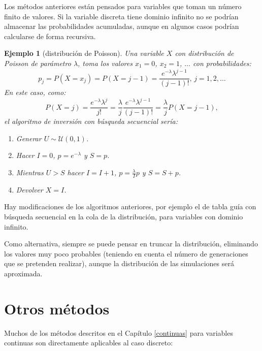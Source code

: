 \documentclass[
]{book}
\theoremstyle{break}
\newtheorem{example}{Ejemplo}[chapter]
\theoremstyle{nonumberplain}
\begin{document}
Los métodos anteriores están pensados para variables que toman un número finito de valores.
Si la variable discreta tiene dominio infinito no se podrían almacenar las probabilidades acumuladas, aunque en algunos casos podrían calcularse de forma recursiva.

\begin{example}[distribución de Poisson]

Una variable \(X\) con distribución de Poisson de parámetro \(\lambda\),
toma los valores \(x_{1}=0\), \(x_{2}=1\), \(\ldots\) con probabilidades:
\[p_{j}=P\left( X=x_{j}\right)  =P\left( X=j-1\right)  =\frac{e^{-\lambda
}\lambda^{j-1}}{\left( j-1\right)  !}\text{, }j=1,2,\ldots\]
En este caso, como:
\[P\left( X=j\right)  =\frac{e^{-\lambda}\lambda^{j}}{j!}
=\frac{\lambda}{j}\frac{e^{-\lambda}\lambda^{j-1}}{\left( j-1\right)  !}
=\frac{\lambda}{j}P\left( X=j-1\right),\]
el algoritmo de inversión con búsqueda secuencial sería:

\begin{enumerate}
\def\labelenumi{\arabic{enumi}.}
\item
  Generar \(U\sim \mathcal{U}\left( 0,1\right)\).
\item
  Hacer \(I=0\), \(p=e^{-\lambda}\) y \(S=p\).
\item
  Mientras \(U>S\) hacer \(I=I+1\), \(p=\frac{\lambda}{I}p\) y \(S=S+p\).
\item
  Devolver \(X=I\).
\end{enumerate}

\end{example}

Hay modificaciones de los algoritmos anteriores, por ejemplo el de tabla guía con búsqueda secuencial en la cola de la distribución, para variables con dominio infinito.

Como alternativa, siempre se puede pensar en truncar la distribución,
eliminando los valores muy poco probables (teniendo en cuenta el número de generaciones que se pretenden realizar),
aunque la distribución de las simulaciones será aproximada.

\hypertarget{otros-muxe9todos}{%
\section{Otros métodos}\label{otros-muxe9todos}}

Muchos de los métodos descritos en el Capítulo \ref{continuas} para variables continuas son directamente aplicables al caso discreto:
\end{document}
